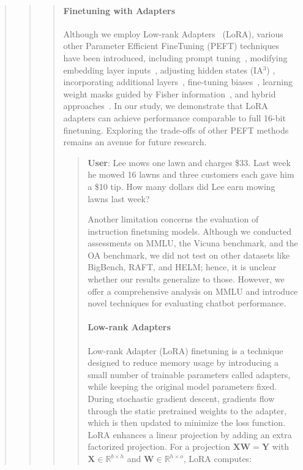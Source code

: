 \begin{quote}
\begin{quote}
\begin{quote}
\paragraph{Finetuning with Adapters} Although we employ Low-rank Adapters~\citep{hu2021lora} (LoRA), various other Parameter Efficient FineTuning (PEFT) techniques have been introduced, including prompt tuning~\citep{qin2021learning,lester2021power,li2021prefix}, modifying embedding layer inputs~\citep{an2022input}, adjusting hidden states (IA$^3$) \citep{liu2022few}, incorporating additional layers~\citep{houlsby2019parameter}, fine-tuning biases~\citep{zaken2021bitfit}, learning weight masks guided by Fisher information~\citep{sung2021training}, and hybrid approaches~\citep{henderson2021compacter}. In our study, we demonstrate that LoRA adapters can achieve performance comparable to full 16-bit finetuning. Exploring the trade-offs of other PEFT methods remains an avenue for future research.

\begin{quote}
    \textbf{User}: Lee mows one lawn and charges \$33. Last week he mowed 16 lawns and three customers each gave him a \$10 tip. How many dollars did Lee earn mowing lawns last week?

Another limitation concerns the evaluation of instruction finetuning models. Although we conducted assessments on MMLU, the Vicuna benchmark, and the OA benchmark, we did not test on other datasets like BigBench, RAFT, and HELM; hence, it is unclear whether our results generalize to those. However, we offer a comprehensive analysis on MMLU and introduce novel techniques for evaluating chatbot performance.

\paragraph{Low-rank Adapters} Low-rank Adapter (LoRA) finetuning \citep{hu2021lora} is a technique designed to reduce memory usage by introducing a small number of trainable parameters called adapters, while keeping the original model parameters fixed. During stochastic gradient descent, gradients flow through the static pretrained weights to the adapter, which is then updated to minimize the loss function. LoRA enhances a linear projection by adding an extra factorized projection. For a projection ${\mathbf{X} \mathbf{W} = \mathbf{Y}}$ with $\mathbf{X} \in \mathbb{R}^{b \times h}$ and $\mathbf{W} \in \mathbb{R}^{h \times o}$, LoRA computes:


\end{quote}
\end{quote}
\end{quote}
\end{quote}
